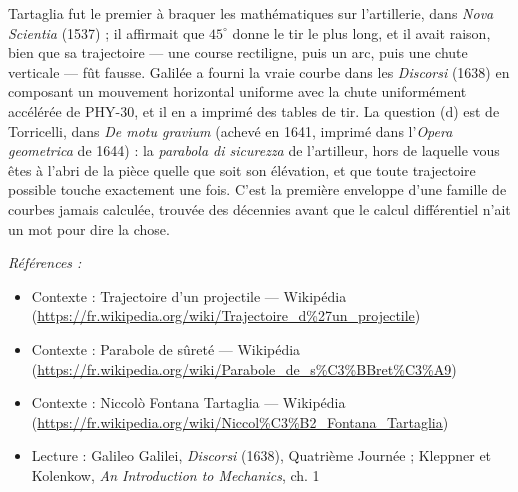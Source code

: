 \documentclass[11pt]{article}
\newenvironment{refs}{\par\small\noindent\emph{Références :}\begin{itemize}\setlength\itemsep{0pt}}{\end{itemize}\normalsize}
\begin{document}
\noindent Tartaglia fut le premier à braquer les mathématiques sur l'artillerie, dans
\textit{Nova Scientia} (1537) ; il affirmait que $ 45^{\circ} $ donne le tir le plus long, et il
avait raison, bien que sa trajectoire --- une course rectiligne, puis un arc, puis une chute
verticale --- fût fausse. Galilée a fourni la vraie courbe dans les \textit{Discorsi} (1638) en
composant un mouvement horizontal uniforme avec la chute uniformément accélérée de PHY-30, et il
en a imprimé des tables de tir. La question (d) est de Torricelli, dans \textit{De motu gravium}
(achevé en 1641, imprimé dans l'\textit{Opera geometrica} de 1644) : la \textit{parabola di sicurezza}
de l'artilleur, hors de laquelle vous êtes à l'abri de la pièce quelle que soit son élévation, et
que toute trajectoire possible touche exactement une fois. C'est la première enveloppe d'une
famille de courbes jamais calculée, trouvée des décennies avant que le calcul différentiel n'ait
un mot pour dire la chose.

\begin{refs}
\item Contexte : Trajectoire d'un projectile --- Wikipédia (\url{https://fr.wikipedia.org/wiki/Trajectoire_d%27un_projectile})
\item Contexte : Parabole de sûreté --- Wikipédia (\url{https://fr.wikipedia.org/wiki/Parabole_de_s%C3%BBret%C3%A9})
\item Contexte : Niccolò Fontana Tartaglia --- Wikipédia (\url{https://fr.wikipedia.org/wiki/Niccol%C3%B2_Fontana_Tartaglia})
\item Lecture : Galileo Galilei, \textit{Discorsi} (1638), Quatrième Journée ; Kleppner et Kolenkow, \textit{An Introduction to Mechanics}, ch. 1
\end{refs}

\bigskip
\end{document}
